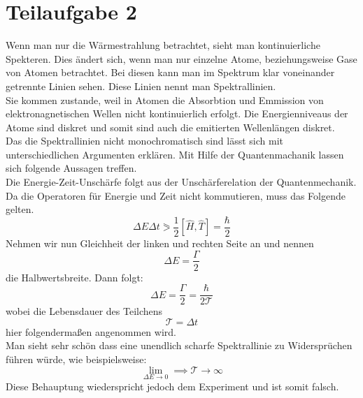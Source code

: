 

\section{Teilaufgabe 2}

Wenn man nur die Wärmestrahlung betrachtet, sieht man kontinuierliche Spekteren. Dies ändert sich, wenn man nur einzelne Atome, beziehungsweise Gase von Atomen betrachtet. Bei diesen kann man im
Spektrum klar voneinander getrennte Linien sehen. Diese Linien nennt man Spektrallinien.\\
Sie kommen zustande, weil in Atomen die Absorbtion und Emmission von elektronagnetischen Wellen nicht kontinuierlich erfolgt. Die Energienniveaus der Atome sind diskret und 
somit sind auch die emitierten Wellenlängen diskret.\\
Das die Spektrallinien nicht monochromatisch sind lässt sich mit unterschiedlichen Argumenten erklären. Mit Hilfe der Quantenmachanik lassen sich folgende Aussagen treffen.\\
Die Energie-Zeit-Unschärfe folgt aus der Unschärferelation der Quantenmechanik. Da die Operatoren für Energie und Zeit nicht kommutieren, muss das Folgende gelten.\\
\begin{equation}
    \Delta E  \Delta t \eqslantgtr \frac{1}{2} [ \hat{H},\hat{T}] =  \frac{\hbar }{2} 
\end{equation}
Nehmen wir nun Gleichheit der linken und rechten Seite an und nennen $$ \Delta E =\frac{\Gamma}{2}$$ die Halbwertsbreite. Dann folgt: \newline
\begin{equation}
    \Delta E =\frac{\Gamma}{2} = \frac{\hbar }{2\mathcal{T} } 
\end{equation}
wobei die Lebensdauer des Teilchens $$\mathcal{T} = \Delta t$$ hier folgendermaßen angenommen wird.\\
Man sieht sehr schön dass eine unendlich scharfe Spektrallinie zu Widersprüchen führen würde, wie beispielsweise:
\begin{equation}
    \lim_{\Delta E \to 0}  \implies \mathcal{T} \longrightarrow \infty 
\end{equation}
Diese Behauptung wiederspricht jedoch dem Experiment und ist somit falsch.